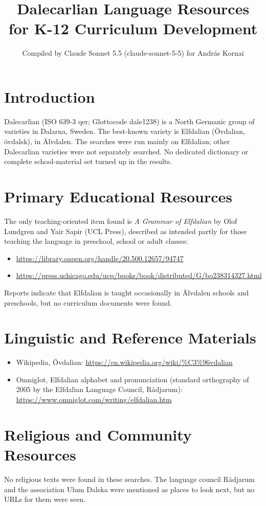 \documentclass[12pt]{article}
\title{Dalecarlian Language Resources for K-12 Curriculum Development}
\author{Compiled by Claude Sonnet 5.5 (claude-sonnet-5-5) for Andr\'as Kornai}
\date{}
\begin{document}
\maketitle

\section{Introduction}
Dalecarlian (ISO 639-3 qer; Glottocode dale1238) is a North Germanic group of varieties in Dalarna, Sweden. The best-known variety is Elfdalian (\"Ovdalian, \"ovdalsk), in \"Alvdalen. The searches were run mainly on Elfdalian; other Dalecarlian varieties were not separately searched. No dedicated dictionary or complete school-material set turned up in the results.

\section{Primary Educational Resources}
The only teaching-oriented item found is \emph{A Grammar of Elfdalian} by Olof Lundgren and Yair Sapir (UCL Press), described as intended partly for those teaching the language in preschool, school or adult classes:
\begin{itemize}
\item \url{https://library.oapen.org/handle/20.500.12657/94747}
\item \url{https://press.uchicago.edu/ucp/books/book/distributed/G/bo238314327.html}
\end{itemize}
Reports indicate that Elfdalian is taught occasionally in \"Alvdalen schools and preschools, but no curriculum documents were found.

\section{Linguistic and Reference Materials}
\begin{itemize}
\item Wikipedia, \"Ovdalian: \url{https://en.wikipedia.org/wiki/%C3%96vdalian}
\item Omniglot, Elfdalian alphabet and pronunciation (standard orthography of 2005 by the Elfdalian Language Council, R\aa\dh djarum): \url{https://www.omniglot.com/writing/elfdalian.htm}
\end{itemize}

\section{Religious and Community Resources}
No religious texts were found in these searches. The language council R\aa\dh djarum and the association Ulum Dalska were mentioned as places to look next, but no URLs for them were seen.
\end{document}
